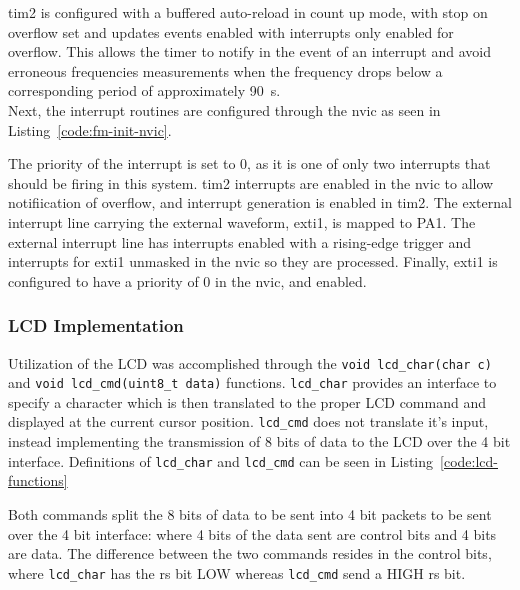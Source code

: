 
\gls{tim2} is configured with a buffered auto-reload in count up mode,
with stop on overflow set and updates events enabled with interrupts
only enabled for overflow. This allows the timer to notify in the event
of an interrupt and avoid erroneous frequencies measurements when the
frequency drops below a corresponding period of approximately
\SI{90}{s}. \\

Next, the interrupt routines are configured through the \gls{nvic} as
seen in Listing~\ref{code:fm-init-nvic}.


The priority of the interrupt is set to 0, as it is one of only two
interrupts that should be firing in this system. \gls{tim2} interrupts
are enabled in the \gls{nvic} to allow notifiication of overflow, and
interrupt generation is enabled in \gls{tim2}. The external interrupt
line carrying the external waveform, \gls{exti1}, is mapped to PA1. The
external interrupt line has interrupts enabled with a rising-edge
trigger and interrupts for \gls{exti1} unmasked in the \gls{nvic} so
they are processed. Finally, \gls{exti1} is configured to have a
priority  of 0 in the \gls{nvic}, and enabled.

\subsubsection{LCD Implementation}
Utilization of the LCD was accomplished through the
\lstinline{void lcd_char(char c)} and
\lstinline{void lcd_cmd(uint8_t data)} functions. \lstinline{lcd_char}
provides an interface to specify a character which is then translated to
the proper LCD command and displayed at the current cursor position.
\lstinline{lcd_cmd} does not translate it's input, instead implementing
the transmission of 8 bits of data to the LCD over the 4 bit interface.
Definitions of \lstinline{lcd_char} and \lstinline{lcd_cmd} can be seen
in Listing~\ref{code:lcd-functions}


Both commands split the 8 bits of data to be sent into 4 bit packets to
be sent over the 4 bit interface: where 4 bits of the data sent are
control bits and 4 bits are data. The difference between the two
commands resides in the control bits, where \lstinline{lcd_char} has the
\gls{rs} bit LOW whereas \lstinline{lcd_cmd} send a HIGH \gls{rs} bit.
\\

